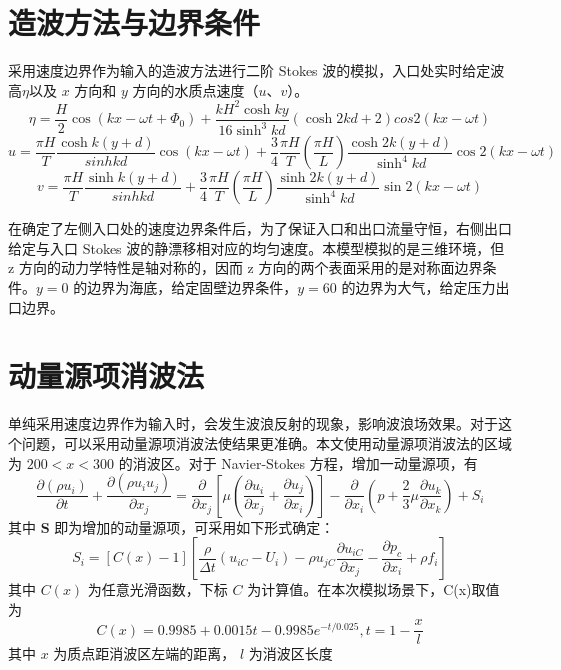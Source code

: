 \section{造波方法与边界条件}
采用速度边界作为输入的造波方法进行二阶 Stokes 波的模拟，入口处实时给定波高$\eta$以及 $x$ 方向和 $y$ 方向的水质点速度（$u$、$v$）\cite{Zou2005}。
\begin{equation}
  \eta = \frac H 2 \cos (kx - \omega t + \Phi _0) + \frac {k H^2 \cosh k y} {16 \sinh ^3 kd} (\cosh 2kd + 2)cos2(kx - \omega t)
\end{equation}
\begin{equation}
  u = \frac {\pi H} T \frac {\cosh k(y + d)} {sinh kd} \cos (kx - \omega t) + \frac 3 4 \frac {\pi H} T \left( \frac {\pi H} L \right) \frac {\cosh 2k(y + d)} {\sinh^4 kd} \cos 2(kx - \omega t)
\end{equation}
\begin{equation}
  v = \frac {\pi H} T \frac {\sinh k(y + d)} {sinh kd} + \frac 3 4 \frac {\pi H} T \left( \frac {\pi H} L \right) \frac {\sinh 2k(y + d)} {\sinh^4 kd} \sin 2(kx - \omega t)
\end{equation}

在确定了左侧入口处的速度边界条件后，为了保证入口和出口流量守恒，右侧出口给定与入口 Stokes 波的静漂移相对应的均匀速度。本模型模拟的是三维环境，但 z 方向的动力学特性是轴对称的，因而 z 方向的两个表面采用的是对称面边界条件。$y = 0$ 的边界为海底，给定固壁边界条件，$y = 60$ 的边界为大气，给定压力出口边界。

\section{动量源项消波法}
单纯采用速度边界作为输入时，会发生波浪反射的现象，影响波浪场效果。对于这个问题，可以采用动量源项消波法使结果更准确\cite{Wang2005,Li2013,Peric2015}。本文使用动量源项消波法的区域为 $200 < x < 300$ 的消波区。对于 Navier-Stokes 方程，增加一动量源项，有
\begin{equation}
  \frac {\partial (\rho u_i)}{\partial t} + \frac {\partial (\rho u_i u_j)}{\partial x_j} = \frac {\partial}{\partial x_j} \left[ \mu \left( \frac {\partial u_i}{\partial x_j} + \frac {\partial u_j}{\partial x_i} \right) \right] - \frac {\partial}{\partial x_i} \left( p + \frac 2 3 \mu \frac {\partial u_k}{\partial x_k} \right) + S_i
\end{equation}
其中 $\mathbf S$ 即为增加的动量源项，可采用如下形式确定：
\begin{equation}
  S_i = [C(x) - 1]\left[ \frac \rho {\Delta t} (u_{iC} - U_i) - \rho u_{jC} \frac {\partial u_{iC}}{\partial x_j} - \frac {\partial p_c} {\partial x_i} + \rho f_i \right]
\end{equation}
其中 $C(x)$ 为任意光滑函数，下标 $C$ 为计算值。在本次模拟场景下，C(x)取值为
\begin{equation}
  C(x) = 0.9985 + 0.0015 t - 0.9985 e^{-t/0.025}, t = 1 - \frac x l
\end{equation}
其中 $x$ 为质点距消波区左端的距离， $l$ 为消波区长度

